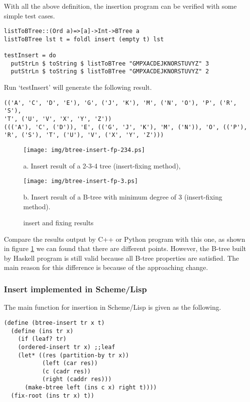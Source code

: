 \documentclass{article}
\begin{document}
With all the above definition, the insertion program can be verified with
some simple test cases.

\begin{lstlisting}
listToBTree::(Ord a)=>[a]->Int->BTree a
listToBTree lst t = foldl insert (empty t) lst

testInsert = do
  putStrLn $ toString $ listToBTree "GMPXACDEJKNORSTUVYZ" 3
  putStrLn $ toString $ listToBTree "GMPXACDEJKNORSTUVYZ" 2
\end{lstlisting}

Run `testInsert' will generate the following result.

\begin{verbatim}
(('A', 'C', 'D', 'E'), 'G', ('J', 'K'), 'M', ('N', 'O'), 'P', ('R', 'S'),
'T', ('U', 'V', 'X', 'Y', 'Z'))
((('A'), 'C', ('D')), 'E', (('G', 'J', 'K'), 'M', ('N')), 'O', (('P'),
'R', ('S'), 'T', ('U'), 'V', ('X', 'Y', 'Z')))
\end{verbatim}

\begin{figure}[htbp]
  \begin{center}
    \texttt{[image: img/btree-insert-fp-234.ps]}

    a. Insert result of a 2-3-4 tree (insert-fixing method),

    \texttt{[image: img/btree-insert-fp-3.ps]}

    b. Insert result of a B-tree with minimum degree of 3 (insert-fixing method).
    \caption{insert and fixing results} \label{fig:btree-insert-fp}
  \end{center}
\end{figure}

Compare the results output by C++ or Python program with this one,
as shown in figure \ref{fig:btree-insert-fp}
we can found that there are different points. However, the B-tree
built by Haskell program is still valid because all B-tree properties
are satisfied. The main reason for this difference is because of
the approaching change.

\subsubsection*{Insert implemented in Scheme/Lisp}
The main function for insertion in Scheme/Lisp is given as the
following.

\lstset{language=lisp}
\begin{lstlisting}
(define (btree-insert tr x t)
  (define (ins tr x)
    (if (leaf? tr)
	(ordered-insert tr x) ;;leaf
	(let* ((res (partition-by tr x))
	       (left (car res))
	       (c (cadr res))
	       (right (caddr res)))
	  (make-btree left (ins c x) right t))))
  (fix-root (ins tr x) t))
\end{lstlisting}
\end{document}
